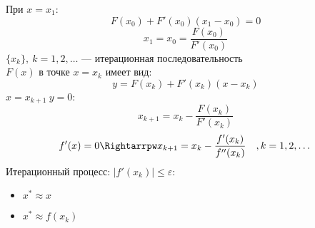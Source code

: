 \documentclass[english]{article}
\theoremstyle{plain}
\theoremstyle{remark}
\theoremstyle{definition}
\begin{document}
При \(x = x_1\):
\[ F(x_0) + F'(x_0)(x_1 - x_0) = 0 \]
\[ x_1 = x_0 = \frac{F(x_0)}{F'(x_0)} \]
\(\{x_k\},\ k = 1, 2, \dots\) --- итерационная последовательность \\
\(F(x)\) в точке \(x = x_k\) имеет вид:
\[ y = F(x_k) + F'(x_k)(x - x_k) \]
\(x = x_{k + 1}\ y = 0\):
\[ x_{k+1} = x_k - \frac{F(x_k)}{F'(x_k)} \]
\[ f'(x) = 0 \Rightarrpw x_{k + 1} = x_k - \frac{f'(x_k)}{f''(x_k)}\quad,k=1,2,\dots \]
Итерационный процесс: \(|f'(x_k)| \le \varepsilon\):
\begin{itemize}
\item \(x^* \approx x\)
\item \(x^* \approx f(x_k)\)
\end{itemize}
\end{document}
